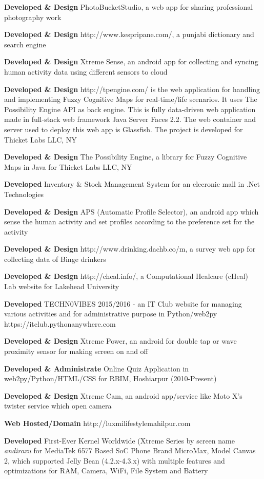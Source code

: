 \documentclass[margin,line]{res}
\begin{document}
\begin{resume}
\textbf{Developed \& Design} PhotoBucketStudio, a web app for sharing professional photography work

\textbf{Developed \& Design} http://www.kespripane.com/, a punjabi dictionary and search engine

\textbf{Developed \& Design} Xtreme Sense, an android app for collecting and syncing human activity data using different sensors to cloud

\textbf{Developed \& Design} http://tpengine.com/ is the web application for handling and implementing Fuzzy Cognitive Maps for real-time/life scenarios. It uses The Possibility Engine API as back engine. This is fully data-driven web application made in full-stack web framework Java Server Faces 2.2. The web container and server used to deploy this web app is Glassfish. The project is developed for  Thicket Labs LLC, NY

\textbf{Developed \& Design} The Possibility Engine, a library for Fuzzy Cognitive Maps in Java for Thicket Labs LLC, NY

\textbf{Developed} Inventory \& Stock Management System for an elecronic mall in .Net Technologies

\textbf{Developed \& Design} APS (Automatic Profile Selector), an android app which sense the human activity and set profiles according to the preference set for the activity

\textbf{Developed \& Design} http://www.drinking.dachb.co/m, a survey web app for collecting data of Binge drinkers

\textbf{Developed \& Design} http://cheal.info/, a Computational Healcare (cHeal) Lab website for Lakehead University

\textbf{Developed} TECHN0VIBES 2015/2016 - an IT Club website for managing various activities and for administrative purpose in Python/web2py https://itclub.pythonanywhere.com

\textbf{Developed \& Design} Xtreme Power, an android for double tap or wave proximity sensor for making screen on and off

\textbf{Developed \& Administrate} Online Quiz Application in web2py/Python/HTML/CSS for RBIM, Hoshiarpur (2010-Present)

\textbf{Developed \& Design} Xtreme Cam, an android app/service like Moto X's twister service which open camera 

\textbf{Web Hosted/Domain} http://luxmilifestylemahilpur.com

\textbf{Developed} First-Ever Kernel Worldwide (Xtreme Series by screen name \textit{andiroxu} for MediaTek 6577 Based SoC Phone Brand MicroMax, Model Canvas 2, which supported Jelly Bean (4.2.x-4.3.x) with multiple features and optimizations for RAM, Camera, WiFi, File System and Battery 


\end{resume}
\end{document}
